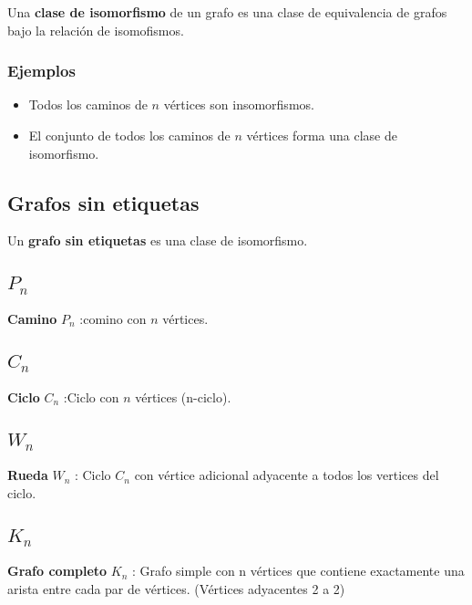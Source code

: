 \documentclass[a4paper]{book}
\begin{document}
Una \textbf{clase de isomorfismo} de un grafo es una clase de equivalencia de
grafos bajo la relación de isomofismos.

\subsubsection{Ejemplos}
\label{ssec:ejemplos}

\begin{itemize}
    \item Todos los caminos de \(n\) vértices son insomorfismos.
    \item El conjunto de todos los caminos de \(n\) vértices forma una clase de
        isomorfismo.
\end{itemize}

\subsection{Grafos sin etiquetas}
\label{ssec:grafos_sin_etiquetas}

Un \textbf{grafo sin etiquetas} es una  clase de isomorfismo.

\subsection{\(P_{n}\)}
\label{ssec:pn}

\textbf{Camino} \(P_{n}\) :comino con \(n\) vértices.

\subsection{\(C_{n}\)}
\label{ssec:cn}

\textbf{Ciclo} \(C_{n}\) :Ciclo con \(n\) vértices (n-ciclo).

\subsection{\(W_{n}\)}
\label{ssec:wn}

\textbf{Rueda} \(W_{n}\) : Ciclo \(C_{n}\) con vértice adicional adyacente a
todos los vertices del ciclo.

\subsection{\(K_{n}\)}
\label{ssec:kn}

\textbf{Grafo completo} \(K_{n}\) : Grafo simple con n vértices que contiene
exactamente una arista entre cada par de vértices. (Vértices adyacentes 2 a 2)
\end{document}
